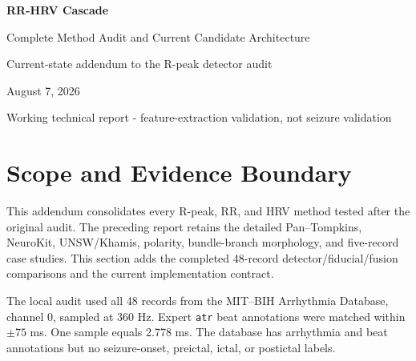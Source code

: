 \documentclass[10pt]{article}
\begin{document}
\hypersetup{pageanchor=false}

\begin{titlepage}
\centering
\vspace*{1.25in}
{\Huge\bfseries\color{navy} RR-HRV Cascade\par}
\vspace{0.16in}
{\LARGE Complete Method Audit and Current Candidate Architecture\par}
\vspace{0.35in}
{\Large Current-state addendum to the R-peak detector audit\par}
\vfill
\begin{minipage}{0.82\linewidth}
\end{minipage}
\vfill
{\large August 7, 2026\par}
{\normalsize Working technical report - feature-extraction validation, not seizure validation\par}
\end{titlepage}

\hypersetup{pageanchor=true}
\tableofcontents
\clearpage
{}

\section{Scope and Evidence Boundary}

This addendum consolidates every R-peak, RR, and HRV method tested after the
original audit. The preceding report retains the detailed Pan--Tompkins,
NeuroKit, UNSW/Khamis, polarity, bundle-branch morphology, and five-record case
studies. This section adds the completed 48-record detector/fiducial/fusion
comparisons and the current implementation contract.

The local audit used all 48 records from the MIT--BIH Arrhythmia Database,
channel 0, sampled at 360 Hz. Expert \texttt{atr} beat annotations were matched
within $\pm75$ ms. One sample equals 2.778 ms. The database has arrhythmia and
beat annotations but no seizure-onset, preictal, ictal, or postictal labels.
\end{document}
